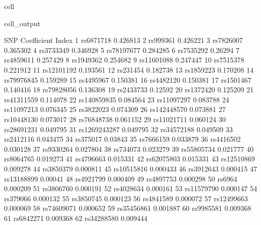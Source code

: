 \documentclass[letterpaper,10pt,english]{jupyterBook}
\begin{document}
\begin{sphinxuseclass}{cell}
\begin{sphinxVerbatimOutput}
\begin{sphinxuseclass}{cell_output}
\begin{sphinxVerbatim}[commandchars=\\\{\}]
                SNP Coefficient
Index                          
1         rs6871718   \PYGZhy{}0.426813
2          rs999361   \PYGZhy{}0.426221
3         rs7826007   \PYGZhy{}0.365302
4         rs3733349   \PYGZhy{}0.346928
5        rs78197677   \PYGZhy{}0.284285
6         rs7535292    \PYGZhy{}0.26294
7         rs4859611   \PYGZhy{}0.257429
8         rs1949362   \PYGZhy{}0.254682
9        rs11601088   \PYGZhy{}0.247447
10        rs7515378   \PYGZhy{}0.221912
11       rs12101192   \PYGZhy{}0.193561
12         rs231454   \PYGZhy{}0.182738
13        rs1859223   \PYGZhy{}0.170208
14       rs79976845   \PYGZhy{}0.159289
15        rs4495967   \PYGZhy{}0.150381
16        rs4482120   \PYGZhy{}0.150381
17        rs1501467   \PYGZhy{}0.140416
18       rs79828056   \PYGZhy{}0.136308
19        rs2433733    \PYGZhy{}0.12592
20        rs1372420   \PYGZhy{}0.125209
21       rs41311559   \PYGZhy{}0.114078
22      rs140859835   \PYGZhy{}0.084564
23       rs11097297   \PYGZhy{}0.083788
24       rs11097213   \PYGZhy{}0.076345
25        rs3822023   \PYGZhy{}0.074309
26      rs142448570   \PYGZhy{}0.073881
27       rs10448130   \PYGZhy{}0.073017
28       rs76848738   \PYGZhy{}0.061152
29       rs11021711   \PYGZhy{}0.060124
30       rs28691231   \PYGZhy{}0.049795
31     rs1269243287   \PYGZhy{}0.049795
32       rs34572188   \PYGZhy{}0.049509
33        rs2412116   \PYGZhy{}0.043475
34         rs375017    \PYGZhy{}0.03843
35        rs7666159   \PYGZhy{}0.033879
36        rs4416502   \PYGZhy{}0.030128
37        rs9330264   \PYGZhy{}0.027804
38         rs734073   \PYGZhy{}0.023279
39       rs55805734   \PYGZhy{}0.021777
40        rs8064765   \PYGZhy{}0.019273
41        rs4796663   \PYGZhy{}0.015331
42       rs62075803   \PYGZhy{}0.015331
43       rs12510869   \PYGZhy{}0.009278
44        rs3850379   \PYGZhy{}0.000811
45       rs10515816   \PYGZhy{}0.000433
46        rs3912643   \PYGZhy{}0.000415
47       rs13188899    \PYGZhy{}0.00041
48        rs4921799   \PYGZhy{}0.000409
49        rs4897753   \PYGZhy{}0.000298
50           rs6964   \PYGZhy{}0.000209
51        rs3806760   \PYGZhy{}0.000191
52        rs4028634   \PYGZhy{}0.000161
53       rs11579790   \PYGZhy{}0.000147
54         rs379066   \PYGZhy{}0.000132
55        rs3850745   \PYGZhy{}0.000123
56        rs4841589   \PYGZhy{}0.000072
57       rs12499663   \PYGZhy{}0.000069
58       rs74609071    0.000652
59       rs35456861    0.001887
60        rs9985581    0.009368
61        rs6842271    0.009368
62       rs34288580    0.009444

\end{sphinxVerbatim}
\end{sphinxuseclass}
\end{sphinxVerbatimOutput}
\end{sphinxuseclass}
\end{document}

